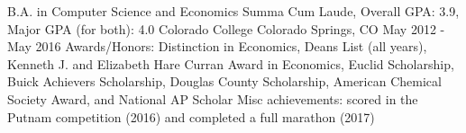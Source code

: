 


\begin{cventries}


\cventry
{B.A. in Computer Science and Economics Summa Cum Laude, Overall GPA: 3.9, Major GPA (for both): 4.0} %
{Colorado College} %
{Colorado Springs, CO} %
{May 2012 - May 2016} %
{Awards/Honors: Distinction in Economics, Deans List (all years), Kenneth J. and Elizabeth Hare Curran Award in Economics, Euclid Scholarship, Buick Achievers Scholarship, Douglas County Scholarship, American Chemical Society Award, and National AP Scholar \newline Misc achievements: scored in the Putnam competition (2016) and completed a full marathon (2017)}


\end{cventries}
